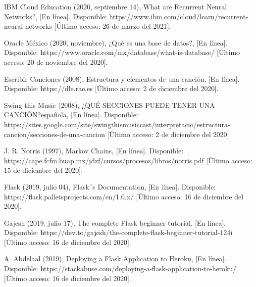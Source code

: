 \documentclass[12pt, a4paper, titlepage]{report}
\begin{document}
\begin{thebibliography}{20}
	IBM Cloud Education (2020, septiembre 14), What are Recurrent Neural Networks?, [En línea]. Disponible: https://www.ibm.com/cloud/learn/recurrent-neural-networks [Último acceso: 26 de marzo del 2021].
	
	Oracle México (2020, noviembre), ¿Qué es una base de datos?, [En línea]. Disponible: https://www.oracle.com/mx/database/what-is-database/ [Último acceso: 20 de noviembre del 2020].
	
	Escribir Canciones (2008), Estructura y elementos de una canción, [En línea]. Disponible: https://dle.rae.es [Último acceso: 2 de diciembre del 2020].
	
	Swing this Music (2008), ¿QUÉ SECCIONES PUEDE TENER UNA CANCIÓN?española, [En línea]. Disponible: https://sites.google.com/site/swingthismusiccast/interpretacio/estructura-cancion/secciones-de-una-cancion [Último acceso: 2 de diciembre del 2020].
	
	J. R. Norris (1997), Markov Chains, [En línea]. Disponible: https://cape.fcfm.buap.mx/jdzf/cursos/procesos/libros/norris.pdf [Último acceso: 15 de diciembre del 2020].
	
	Flask (2019, julio 04), Flask´s Documentation, [En línea]. Disponible: https://flask.palletsprojects.com/en/1.0.x/ [Último acceso: 16 de diciembre del 2020].
	
	Gajesh (2019, julio 17), The complete Flask beginner tutorial, [En línea]. Disponible: https://dev.to/gajesh/the-complete-flask-beginner-tutorial-124i [Último acceso: 16 de diciembre del 2020].
	
	A. Abdelaal (2019), Deploying a Flask Application to Heroku, [En línea]. Disponible: https://stackabuse.com/deploying-a-flask-application-to-heroku/ [Último acceso: 16 de diciembre del 2020].
	

\end{thebibliography}
\end{document}
